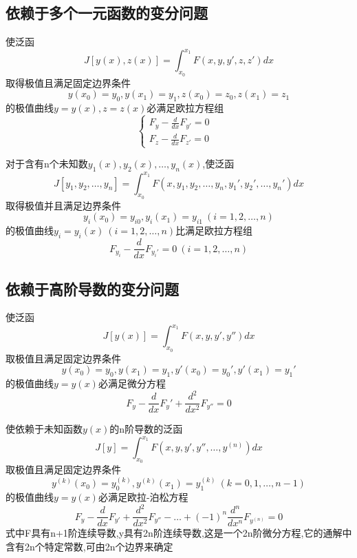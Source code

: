 \documentclass{book}
\begin{document}
\subsection{依赖于多个一元函数的变分问题}
\begin{theorem}
使泛函$$J[y(x),z(x)]=\int_{x_0}^{x_1}F(x,y,y',z,z')dx$$取得极值且满足固定边界条件
$$ y(x_0)=y_0,y(x_1)=y_1,z(x_0)=z_0,z(x_1)=z_1 $$
的极值曲线$y=y(x),z=z(x)$必满足欧拉方程组
$$
\left\{
  \begin{array}{ll}
    F_y - \frac{d}{dx}F_{y'}=0 & \\
    F_z - \frac{d}{dx}F_{z'}=0 &
  \end{array}
\right.
$$
\end{theorem}

\begin{corollary}
对于含有n个未知数$y_1(x),y_2(x) ,\ldots , y_n(x)$,使泛函
$$J[y_1,y_2 ,\ldots , y_n]=\int_{x_0}^{x_1}F(x,y_1,y_2 ,\ldots , y_n,y_1',y_2' ,\ldots , y_n')dx$$
取得极值并且满足边界条件
$$y_i(x_0)=y_{i0},y_i(x_1)=y_{i1} ~(i=1,2,\dots,n)$$
的极值曲线$y_i=y_i(x)~ (i=1,2,\dots,n)$比满足欧拉方程组
$$F_{y_i} -  \frac{d}{dx}F_{y_i'}=0 ~(i=1,2,\dots,n)$$
\end{corollary}

\subsection{依赖于高阶导数的变分问题}
\begin{theorem}
使泛函
$$J[y(x)]=\int_{x_0}^{x_1}F(x,y,y',y'')dx$$
取极值且满足固定边界条件
$$ y(x_0)=y_0,y(x_1)=y_1,y'(x_0)=y_0',y'(x_1)=y_1' $$
的极值曲线$y=y(x)$必满足微分方程
$$F_y - \frac{d}{dx}F_y' + \frac{d^2}{dx^2}F_{y''} = 0 $$
\end{theorem}

\begin{corollary}
使依赖于未知函数$y(x)$的n阶导数的泛函
$$J[y]=\int_{x_0}^{x_1}F(x,y,y',y'', \ldots , y^{(n)})dx$$
取极值且满足固定边界条件
$$ y^{(k)}(x_0)=y_0^{(k)}, y^{(k)}(x_1)=y_1^{(k)} ~ (k= 0,1,\ldots , n-1) $$
的极值曲线$y=y(x)$必满足欧拉-泊松方程
$$F_y - \frac{d}{dx}F_{y'} + \frac{d^2}{dx^2}F_{y''} - \dots + (-1)^{n}\frac{d^n}{dx^n}F_{y^{(n)}}=0  $$
式中F具有n+1阶连续导数,y具有2n阶连续导数,这是一个2n阶微分方程,它的通解中含有2n个特定常数,可由2n个边界来确定
\end{corollary}
\end{document}
